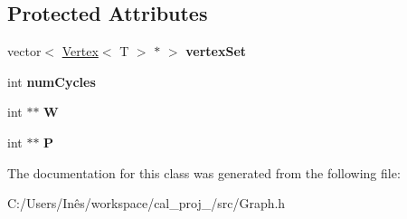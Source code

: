 \subsection*{Protected Attributes}
\begin{DoxyCompactItemize}
\item 
\hypertarget{class_graph_a73d4e735fc0a7c83c9c689a2b53fa623}{}vector$<$ \hyperlink{class_vertex}{Vertex}$<$ T $>$ $\ast$ $>$ {\bfseries vertex\+Set}\label{class_graph_a73d4e735fc0a7c83c9c689a2b53fa623}

\item 
\hypertarget{class_graph_ad5cc402f1b24d30ae12ffc2622ffbd5f}{}int {\bfseries num\+Cycles}\label{class_graph_ad5cc402f1b24d30ae12ffc2622ffbd5f}

\item 
\hypertarget{class_graph_a20edce9af2c8ea8725ccbb5201eace38}{}int $\ast$$\ast$ {\bfseries W}\label{class_graph_a20edce9af2c8ea8725ccbb5201eace38}

\item 
\hypertarget{class_graph_a8198bca6e66c0c95e24062e40813ebba}{}int $\ast$$\ast$ {\bfseries P}\label{class_graph_a8198bca6e66c0c95e24062e40813ebba}

\end{DoxyCompactItemize}


The documentation for this class was generated from the following file\+:\begin{DoxyCompactItemize}
\item 
C\+:/\+Users/\+Inês/workspace/cal\+\_\+proj\+\_/src/Graph.\+h\end{DoxyCompactItemize}
